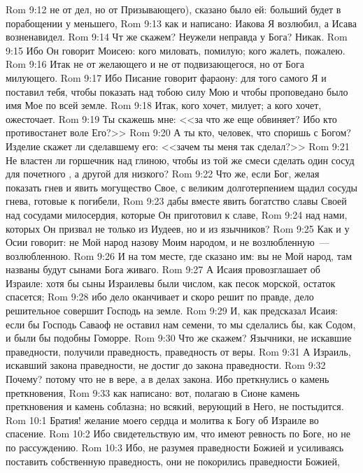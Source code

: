 \vs Rom 9:12 не от дел, но от Призывающего), сказано было ей: больший будет в порабощении у меньшего,
\vs Rom 9:13 как и написано: Иакова Я возлюбил, а Исава возненавидел.
\rsbpar\vs Rom 9:14 Чт же скажем? Неужели неправда у Бога? Никак.
\vs Rom 9:15 Ибо Он говорит Моисею: кого миловать, помилую; кого жалеть, пожалею.
\vs Rom 9:16 Итак  не от желающего и не от подвизающегося, но от Бога милующего.
\vs Rom 9:17 Ибо Писание говорит фараону: для того самого Я и поставил тебя, чтобы показать над тобою силу Мою и чтобы проповедано было имя Мое по всей земле.
\vs Rom 9:18 Итак, кого хочет, милует; а кого хочет, ожесточает.
\rsbpar\vs Rom 9:19 Ты скажешь мне: <<за что же еще обвиняет? Ибо кто противостанет воле Его?>>
\vs Rom 9:20 А ты кто, человек, что споришь с Богом? Изделие скажет ли сделавшему его: <<зачем ты меня так сделал?>>
\vs Rom 9:21 Не властен ли горшечник над глиною, чтобы из той же смеси сделать один сосуд для почетного , а другой для низкого?
\vs Rom 9:22 Что же, если Бог, желая показать гнев и явить могущество Свое, с великим долготерпением щадил сосуды гнева, готовые к погибели,
\vs Rom 9:23 дабы вместе явить богатство славы Своей над сосудами милосердия, которые Он приготовил к славе,
\vs Rom 9:24 над нами, которых Он призвал не только из Иудеев, но и из язычников?
\vs Rom 9:25 Как и у Осии говорит: не Мой народ назову Моим народом, и не возлюбленную~--- возлюбленною.
\vs Rom 9:26 И на том месте, где сказано им: вы не Мой народ, там названы будут сынами Бога живаго.
\vs Rom 9:27 А Исаия провозглашает об Израиле: хотя бы сыны Израилевы были числом, как песок морской,  остаток спасется;
\vs Rom 9:28 ибо дело оканчивает и скоро решит по правде, дело решительное совершит Господь на земле.
\vs Rom 9:29 И, как предсказал Исаия: если бы Господь Саваоф не оставил нам семени, то мы сделались бы, как Содом, и были бы подобны Гоморре.
\rsbpar\vs Rom 9:30 Что же скажем? Язычники, не искавшие праведности, получили праведность, праведность от веры.
\vs Rom 9:31 А Израиль, искавший закона праведности, не достиг до закона праведности.
\vs Rom 9:32 Почему? потому что  не в вере, а в делах закона. Ибо преткнулись о камень преткновения,
\vs Rom 9:33 как написано: вот, полагаю в Сионе камень преткновения и камень соблазна; но всякий, верующий в Него, не постыдится.
\vs Rom 10:1 Братия! желание моего сердца и молитва к Богу об Израиле во спасение.
\vs Rom 10:2 Ибо свидетельствую им, что имеют ревность по Боге, но не по рассуждению.
\vs Rom 10:3 Ибо, не разумея праведности Божией и усиливаясь поставить собственную праведность, они не покорились праведности Божией,
